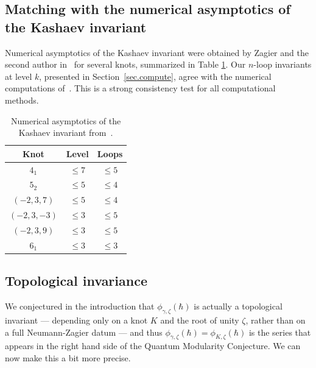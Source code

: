 \documentclass[12pt]{amsart}
\theoremstyle{definition}
\begin{document}
\subsection{Matching with the numerical asymptotics of the Kashaev
invariant}
\label{sub.matching}


Numerical asymptotics of the Kashaev invariant were obtained by Zagier
and the second author in~\cite{GZ1} for several knots, summarized in Table 
\ref{tab.num.kashaev}.
Our $n$-loop invariants at level $k$, presented in Section~\ref{sec.compute},
agree with the numerical computations of~\cite{GZ1}. This is a strong 
consistency test for all computational methods. 

\begin{table}[htb]
\begin{center}
\begin{tabular}{|c|c|c|}\hline
Knot & Level & Loops \\ \hline
$4_1$ & $\leq 7$ & $\leq 5$ \\ \hline
$5_2$ & $\leq 5$ & $\leq 4$ \\ \hline
$(-2,3,7)$ & $\leq 5$ & $\leq 4$ \\ \hline
$(-2,3,-3)$ & $\leq 3$ & $\leq 5$ \\ \hline
$(-2,3,9)$ & $\leq 3$ & $\leq 5$ \\ \hline
$6_1$ & $\leq 3$ & $\leq 3$ \\ \hline
\end{tabular}\vspace{.2cm}
\caption{Numerical asymptotics of the Kashaev invariant from~\cite{GZ1}.} 
\label{tab.num.kashaev}
\end{center}
\end{table}

\subsection{Topological invariance}
\label{sub.inv}

We conjectured in the introduction that $\phi_{\gamma,\zeta}(\hbar)$ is 
actually a topological invariant --- depending only on a knot $K$ and the 
root of unity $\zeta$, rather than on a full Neumann-Zagier datum --- and 
thus $\phi_{\gamma,\zeta}(\hbar) = \phi_{K,\zeta}(\hbar)$ is the series that 
appears in the right hand side of the Quantum Modularity Conjecture. 
We can now make this a bit more precise.
\end{document}
